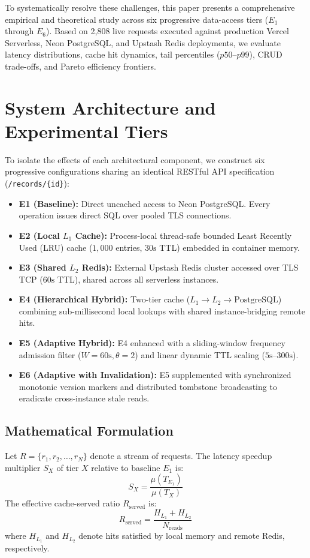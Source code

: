 \documentclass[conference]{IEEEtran}
\begin{document}
To systematically resolve these challenges, this paper presents a comprehensive empirical and theoretical study across six progressive data-access tiers ($E_1$ through $E_6$). Based on 2,808 live requests executed against production Vercel Serverless, Neon PostgreSQL, and Upstash Redis deployments, we evaluate latency distributions, cache hit dynamics, tail percentiles ($p50$--$p99$), CRUD trade-offs, and Pareto efficiency frontiers.

\section{System Architecture and Experimental Tiers}
To isolate the effects of each architectural component, we construct six progressive configurations sharing an identical RESTful API specification (\texttt{/records/\{id\}}):

\begin{itemize}
    \item \textbf{E1 (Baseline):} Direct uncached access to Neon PostgreSQL. Every operation issues direct SQL over pooled TLS connections.
    \item \textbf{E2 (Local $L_1$ Cache):} Process-local thread-safe bounded Least Recently Used (LRU) cache ($1,000$ entries, $30\text{s}$ TTL) embedded in container memory.
    \item \textbf{E3 (Shared $L_2$ Redis):} External Upstash Redis cluster accessed over TLS TCP ($60\text{s}$ TTL), shared across all serverless instances.
    \item \textbf{E4 (Hierarchical Hybrid):} Two-tier cache ($L_1 \rightarrow L_2 \rightarrow \text{PostgreSQL}$) combining sub-millisecond local lookups with shared instance-bridging remote hits.
    \item \textbf{E5 (Adaptive Hybrid):} E4 enhanced with a sliding-window frequency admission filter ($W=60\text{s}, \theta=2$) and linear dynamic TTL scaling ($5\text{s}\text{--}300\text{s}$).
    \item \textbf{E6 (Adaptive with Invalidation):} E5 supplemented with synchronized monotonic version markers and distributed tombstone broadcasting to eradicate cross-instance stale reads.
\end{itemize}

\subsection{Mathematical Formulation}
Let $R = \{r_1, r_2, \dots, r_N\}$ denote a stream of requests. The latency speedup multiplier $S_X$ of tier $X$ relative to baseline $E_1$ is:
\begin{equation}
S_X = \frac{\mu(T_{E_1})}{\mu(T_X)}
\end{equation}
The effective cache-served ratio $R_{\text{served}}$ is:
\begin{equation}
R_{\text{served}} = \frac{H_{L_1} + H_{L_2}}{N_{\text{reads}}}
\end{equation}
where $H_{L_1}$ and $H_{L_2}$ denote hits satisfied by local memory and remote Redis, respectively.
\end{document}
